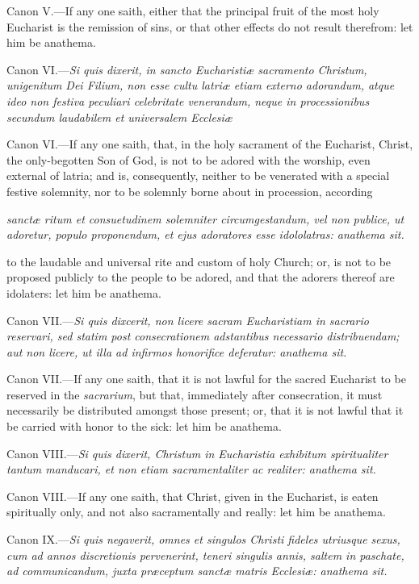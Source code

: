Canon V.—If any one saith, either that the principal fruit of the most holy Eucharist is the remission of sins, or that other effects do not result therefrom: let him be anathema.

Canon VI.—\emph{Si quis dixerit, in sancto Eucharistiæ sacramento Christum, unigenitum Dei Filium, non esse cultu latriæ etiam externo adorandum, atque ideo non festiva peculiari celebritate venerandum, neque in processionibus secundum laudabilem et universalem Ecclesiæ }

Canon VI.—If any one saith, that, in the holy sacrament of the Eucharist, Christ, the only-begotten Son of God, is not to be adored with the worship, even external of latria; and is, consequently, neither to be venerated with a special festive solemnity, nor to be solemnly borne about in procession, according

\emph{sanctæ ritum et consuetudinem solemniter circumgestandum, vel non publice, ut adoretur, populo proponendum, et ejus adoratores esse idololatras: anathema sit.}

to the laudable and universal rite and custom of holy Church; or, is not to be proposed publicly to the people to be adored, and that the adorers thereof are idolaters: let him be anathema.

Canon VII.—\emph{Si quis dixcerit, non licere sacram Eucharistiam in sacrario reservari, sed statim post consecrationem adstantibus necessario distribuendam; aut non licere, ut illa ad infirmos honorifice deferatur: anathema sit.}

Canon VII.—If any one saith, that it is not lawful for the sacred Eucharist to be reserved in the \emph{sacrarium}, but that, immediately after consecration, it must necessarily be distributed amongst those present; or, that it is not lawful that it be carried with honor to the sick: let him be anathema.

Canon VIII.—\emph{Si quis dixerit, Christum in Eucharistia exhibitum spiritualiter tantum manducari, et non etiam sacramentaliter ac realiter: anathema sit.}

Canon VIII.—If any one saith, that Christ, given in the Eucharist, is eaten spiritually only, and not also sacramentally and really: let him be anathema.

Canon IX.—\emph{Si quis negaverit, omnes et singulos Christi fideles utriusque sexus, cum ad annos discretionis pervenerint, teneri singulis annis, saltem in paschate, ad communicandum, juxta præceptum sanctæ matris Ecclesiæ: anathema sit.}

